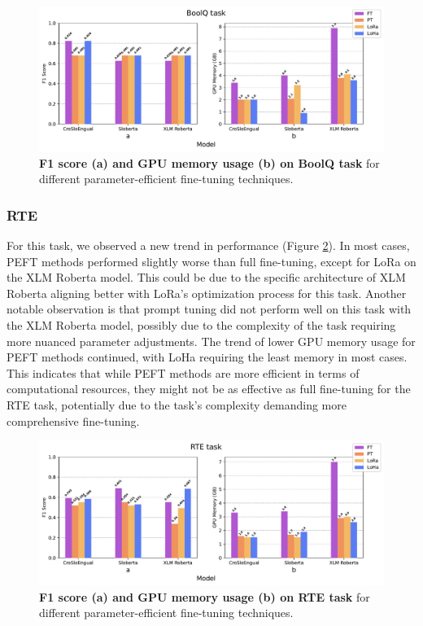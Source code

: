 \documentclass[fleqn,moreauthors,10pt]{ds_report}
\begin{document}
\begin{figure}[ht]\centering
	\includegraphics[width=\linewidth]{results/superglue/BoolQ.pdf}
	\caption{\textbf{F1 score (a) and GPU memory usage (b) on BoolQ task} for different parameter-efficient fine-tuning techniques.}
	\label{fig:boolq_scores}
\end{figure}

\subsubsection*{RTE}

For this task, we observed a new trend in performance (Figure \ref{fig:rte_scores}). In most cases, PEFT methods performed slightly worse than full fine-tuning, except for LoRa on the XLM Roberta model. This could be due to the specific architecture of XLM Roberta aligning better with LoRa's optimization process for this task. Another notable observation is that prompt tuning did not perform well on this task with the XLM Roberta model, possibly due to the complexity of the task requiring more nuanced parameter adjustments. The trend of lower GPU memory usage for PEFT methods continued, with LoHa requiring the least memory in most cases. This indicates that while PEFT methods are more efficient in terms of computational resources, they might not be as effective as full fine-tuning for the RTE task, potentially due to the task's complexity demanding more comprehensive fine-tuning.

\begin{figure}[ht]\centering
	\includegraphics[width=\linewidth]{results/superglue/RTE.pdf}
	\caption{\textbf{F1 score (a) and GPU memory usage (b) on RTE task} for different parameter-efficient fine-tuning techniques.}
	\label{fig:rte_scores}
\end{figure}
\end{document}
